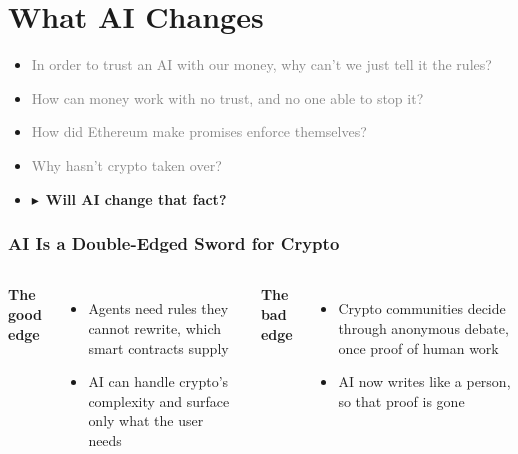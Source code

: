 \documentclass[aspectratio=169]{beamer}
\newcommand{\bi}{\begin{itemize}}
\newcommand{\ei}{\end{itemize}}
\newcommand{\m}{\item}
\begin{document}
\section{What AI Changes}
\begin{frame}
\vfill
\begin{itemize}
\setlength{\itemsep}{3mm}
\item[] \textcolor{gray}{In order to trust an AI with our money, why can't we just tell it the rules?}
\item[] \textcolor{gray}{How can money work with no trust, and no one able to stop it?}
\item[] \textcolor{gray}{How did Ethereum make promises enforce themselves?}
\item[] \textcolor{gray}{Why hasn't crypto taken over?}
\item[] {\large\textcolor{gtnavy}{\hspace*{8mm}$\blacktriangleright$\ \textbf{Will AI change that fact?}}}
\end{itemize}
\vfill
\end{frame}


\begin{frame}[label=main-edges]
\frametitle{AI Is a Double-Edged Sword for Crypto}

\begin{columns}[T]
\textbf{\textcolor{gtnavy}{The good edge}}
\bi
\m Agents need rules they cannot rewrite, which smart contracts supply
\m AI can handle crypto's complexity and surface only what the user needs
\ei
{}

\textbf{\textcolor{gtred}{The bad edge}}
\bi
\m Crypto communities decide through anonymous debate, once proof of human work
\m AI now writes like a person, so that proof is gone
\ei
\end{columns}
\end{frame}
\end{document}
